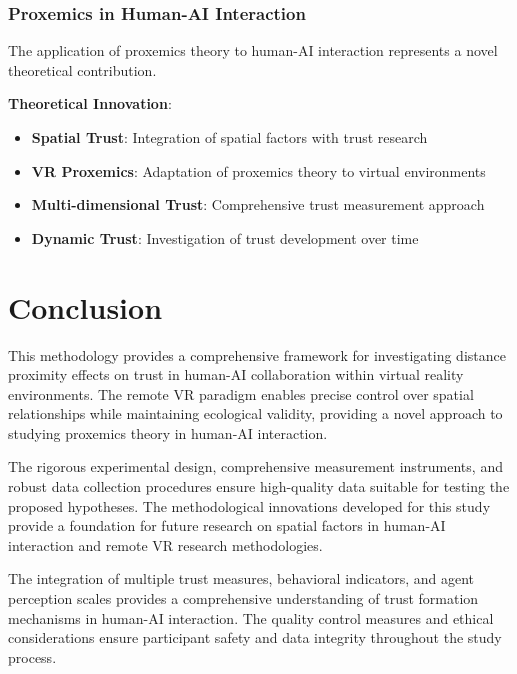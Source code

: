 \documentclass[12pt]{article}
\begin{document}
\subsubsection{Proxemics in Human-AI Interaction}

The application of proxemics theory to human-AI interaction represents a novel theoretical contribution.

\textbf{Theoretical Innovation}:
\begin{itemize}
    \item \textbf{Spatial Trust}: Integration of spatial factors with trust research
    \item \textbf{VR Proxemics}: Adaptation of proxemics theory to virtual environments
    \item \textbf{Multi-dimensional Trust}: Comprehensive trust measurement approach
    \item \textbf{Dynamic Trust}: Investigation of trust development over time
\end{itemize}

\section{Conclusion}

This methodology provides a comprehensive framework for investigating distance proximity effects on trust in human-AI collaboration within virtual reality environments. The remote VR paradigm enables precise control over spatial relationships while maintaining ecological validity, providing a novel approach to studying proxemics theory in human-AI interaction.

The rigorous experimental design, comprehensive measurement instruments, and robust data collection procedures ensure high-quality data suitable for testing the proposed hypotheses. The methodological innovations developed for this study provide a foundation for future research on spatial factors in human-AI interaction and remote VR research methodologies.

The integration of multiple trust measures, behavioral indicators, and agent perception scales provides a comprehensive understanding of trust formation mechanisms in human-AI interaction. The quality control measures and ethical considerations ensure participant safety and data integrity throughout the study process.
\end{document}
